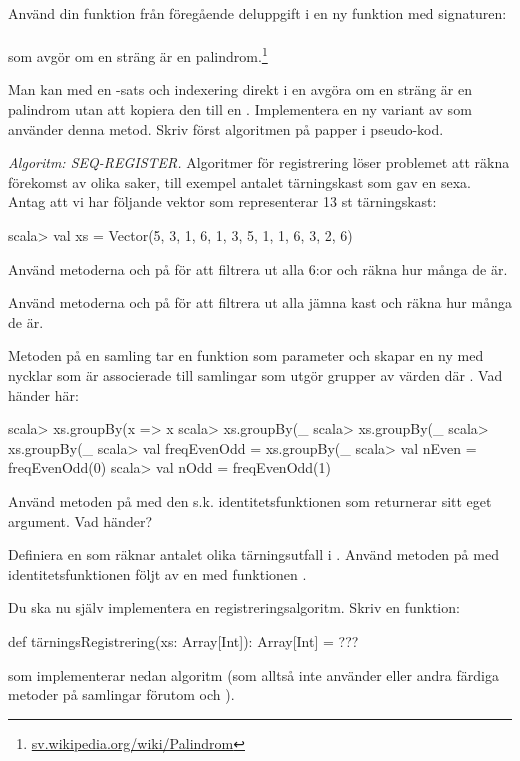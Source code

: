 \Subtask Använd din funktion  från föregående deluppgift i en ny funktion med signaturen:\\
  \\ som avgör om en sträng är en palindrom.\footnote{\href{https://sv.wikipedia.org/wiki/Palindrom}{sv.wikipedia.org/wiki/Palindrom}}

\Subtask\Pen Man kan med en -sats och indexering direkt i en  avgöra om en sträng är en palindrom utan att kopiera den till en . Implementera en ny variant av  som använder denna metod. Skriv först algoritmen på papper i pseudo-kod.

\Task \label{task:seq-reg} \emph{Algoritm: SEQ-REGISTER.} Algoritmer för registrering löser problemet att räkna förekomst av olika saker, till exempel antalet tärningskast som gav en sexa. Antag att vi har följande vektor  som representerar 13 st tärningskast:
\begin{REPL}
scala> val xs = Vector(5, 3, 1, 6, 1, 3, 5, 1, 1, 6, 3, 2, 6)
\end{REPL}
\Subtask Använd metoderna  och  på  för att filtrera ut alla 6:or och räkna hur många de är.

\Subtask Använd metoderna  och  på  för att filtrera ut alla jämna kast och räkna hur många de är.

\Subtask Metoden  på en samling tar en funktion  som parameter och skapar en ny  med nycklar  som är associerade till samlingar som utgör grupper av värden där
.  Vad händer här:
\begin{REPL}
scala> xs.groupBy(x => x %
scala> xs.groupBy(_ %
scala> xs.groupBy(_ %
scala> xs.groupBy(_ %
scala> val freqEvenOdd = xs.groupBy(_ %
scala> val nEven = freqEvenOdd(0)
scala> val nOdd = freqEvenOdd(1)
\end{REPL}
\Subtask Använd metoden  på  med den s.k. identitetsfunktionen  som returnerar sitt eget argument. Vad händer?

\Subtask Definiera en  som räknar antalet olika tärningsutfall i . Använd metoden  på  med identitetsfunktionen följt av en  med funktionen .

\Subtask Du ska nu själv implementera en registreringsalgoritm. Skriv en funktion:
\begin{Code}
def tärningsRegistrering(xs: Array[Int]): Array[Int] = ???
\end{Code}
som implementerar nedan algoritm (som alltså inte använder  eller andra färdiga metoder på samlingar förutom  och ).

